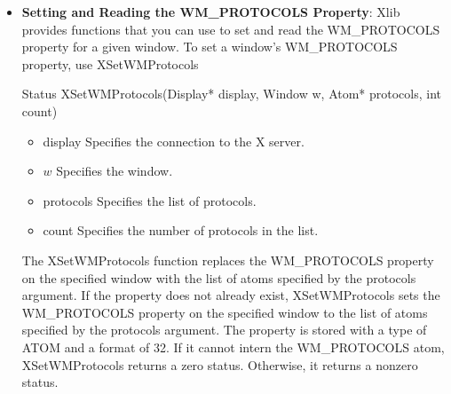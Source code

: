 \documentclass{report}
\begin{document}
\begin{itemize}
\begin{itemize}
            \bigbreak \noindent 
            \begin{cppcode}
                Status XGetTransientForHint(Display* display, Window w, Window* prop\_window\_return)
            \end{cppcode}
            \begin{itemize}
                \item display Specifies the connection to the X server.
                \item $w$ Specifies the window.
                \item prop\_window\_return Returns the WM\_TRANSIENT\_FOR property of the specified window.
            \end{itemize}
            The XGetTransientForHint function returns the WM\_TRANSIENT\_FOR property for the specified window. It returns a nonzero status on success; otherwise, it returns a zero status.
            \bigbreak \noindent 
            XGetTransientForHint can generate a BadWindow error.
        \item \textbf{Setting and Reading the WM\_PROTOCOLS Property}: Xlib provides functions that you can use to set and read the WM\_PROTOCOLS property for a given window.
            \bigbreak \noindent 
            To set a window’s WM\_PROTOCOLS property, use XSetWMProtocols
            \bigbreak \noindent 
            \begin{cppcode}
                Status XSetWMProtocols(Display* display, Window w, Atom* protocols, int count)
            \end{cppcode}
            \begin{itemize}
                \item display Specifies the connection to the X server.
                \item $w$ Specifies the window.
                \item protocols Specifies the list of protocols.
                \item count Specifies the number of protocols in the list.
            \end{itemize}
            The XSetWMProtocols function replaces the WM\_PROTOCOLS property on the specified window with the list of atoms specified by the protocols argument. If the property does not already exist, XSetWMProtocols sets the WM\_PROTOCOLS property on the specified window to the list of atoms specified by the protocols argument. The property is stored with a type of ATOM and a format of 32. If it cannot intern the WM\_PROTOCOLS atom, XSetWMProtocols returns a zero status. Otherwise, it returns a nonzero status.

\end{itemize}
\end{itemize}
\end{document}
